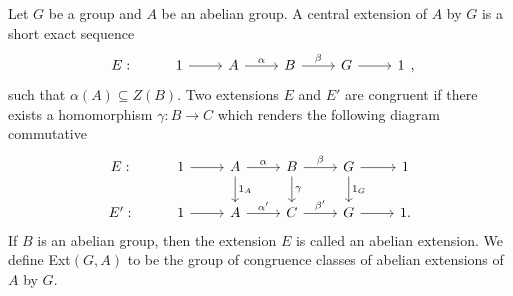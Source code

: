 \documentclass[preprint,sort&compress,12pt]{elsarticle}
\newtheorem{theorem}{Theorem}[section]
\numberwithin{equation}{section}
\theoremstyle{definition}
\newtheorem{definition}[theorem]{Definition}
\begin{document}
    Let $G$  be a group and $A$ be an abelian group. A central extension of $A$ by $G$ is a short exact sequence 
\[
\begin{tikzcd}
  E:& 1 \arrow[r] & A \arrow[r,"\alpha"] & B \arrow[r, "\beta"] & G \ar[r] & 1
\end{tikzcd},
\]
such that $\alpha(A) \subseteq Z(B)$. Two extensions $E$ and $E'$ are congruent if there exists a homomorphism $\gamma:B \to C$ which renders the following diagram commutative
\[
\begin{tikzcd}
  E: & 1 \arrow[r] & A \arrow[d, "1_A"] \arrow[r, "\alpha"] & B \arrow[d, "\gamma"] \arrow[r, "\beta"] & G \arrow[d, "1_G"] \arrow[r] & 1\\
  E': &1 \arrow[r] & A \arrow[r, "\alpha'"] & C \arrow[r, "\beta'"] & G \ar[r] & 1.
\end{tikzcd}
\]
If $B$ is an abelian group, then the extension $E$ is called an abelian extension.
We define Ext$(G,A)$ to be the group of congruence classes of abelian extensions of $A$ by $G$.
\end{document}
